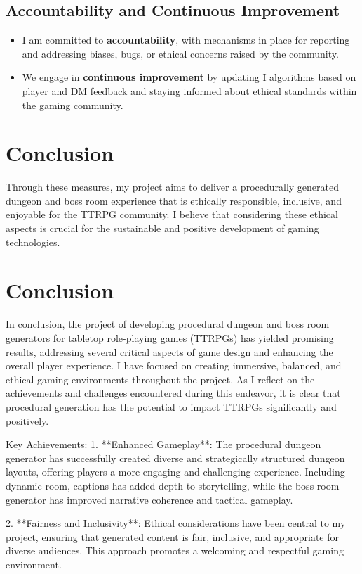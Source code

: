 \documentclass[10pt,twocolumn]{article}
\begin{document}
\subsection{Accountability and Continuous Improvement}
\begin{itemize}
    \item I am committed to \textbf{accountability}, with mechanisms in place for reporting and addressing biases, bugs, or ethical concerns raised by the community.
    \item We engage in \textbf{continuous improvement} by updating I algorithms based on player and DM feedback and staying informed about ethical standards within the gaming community.
\end{itemize}

\section{Conclusion}
Through these measures, my project aims to deliver a procedurally generated dungeon and boss room experience that is ethically responsible, inclusive, and enjoyable for the TTRPG community. I believe that considering these ethical aspects is crucial for the sustainable and positive development of gaming technologies.


\section{Conclusion}

In conclusion, the project of developing procedural dungeon and boss room generators for tabletop role-playing games (TTRPGs) has yielded promising results, addressing several critical aspects of game design and enhancing the overall player experience. I have focused on creating immersive, balanced, and ethical gaming environments throughout the project. As I reflect on the achievements and challenges encountered during this endeavor, it is clear that procedural generation has the potential to impact TTRPGs significantly and positively.

Key Achievements:
1. **Enhanced Gameplay**: The procedural dungeon generator has successfully created diverse and strategically structured dungeon layouts, offering players a more engaging and challenging experience. Including dynamic room, captions has added depth to storytelling, while the boss room generator has improved narrative coherence and tactical gameplay.

2. **Fairness and Inclusivity**: Ethical considerations have been central to my project, ensuring that generated content is fair, inclusive, and appropriate for diverse audiences. This approach promotes a welcoming and respectful gaming environment.
\end{document}

